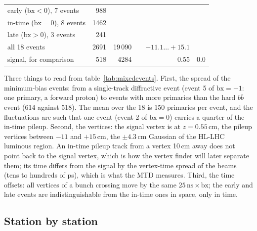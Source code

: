 \documentclass[11pt,a4paper]{article}
\newcommand{\bx}{\ensuremath{\mathrm{bx}}}
\newcommand{\bbbar}{\ensuremath{b\bar{b}}}
\newcommand{\ns}{\,\mathrm{ns}}
\newcommand{\cm}{\,\mathrm{cm}}
\begin{document}
\begin{table}[H]
\begin{tabular}{ccrrrrr}
\midrule
\multicolumn{2}{l}{early ($\bx<0$), 7 events} & 988 & \multicolumn{4}{l}{} \\
\multicolumn{2}{l}{in-time ($\bx=0$), 8 events} & 1462 & \multicolumn{4}{l}{} \\
\multicolumn{2}{l}{late ($\bx>0$), 3 events} & 241 & \multicolumn{4}{l}{} \\
\multicolumn{2}{l}{all 18 events} & 2691 & 19\,090 & & $-11.1\ldots+15.1$ & \\
\multicolumn{2}{l}{signal, for comparison} & 518 & 4284 & & $0.55$ & $0.0$ \\
\bottomrule
\end{tabular}
\end{table}

Three things to read from table~\ref{tab:mixedevents}. First, the spread of the minimum-bias events: from a
single-track diffractive event (event 5 of $\bx=-1$: one primary, a forward proton) to events with more
primaries than the hard \bbbar{} event (614 against 518). The mean over the 18 is 150 primaries per event,
and the fluctuations are such that one event (event 2 of $\bx=0$) carries a quarter of the in-time pileup.
Second, the vertices: the signal vertex is at $z=0.55\cm$, the pileup vertices between $-11$ and $+15\cm$, the
$\pm4.3\cm$ Gaussian of the HL-LHC luminous region. An in-time pileup track from a vertex 10\,cm away does not
point back to the signal vertex, which is how the vertex finder will later separate them; its time differs
from the signal by the vertex-time spread of the beams (tens to hundreds of ps), which is what the MTD
measures. Third, the time offsets: all vertices of a bunch crossing move by the same $25\ns\times\bx$; the
early and late events are indistinguishable from the in-time ones in space, only in time.

\subsection{Station by station}
\end{document}
